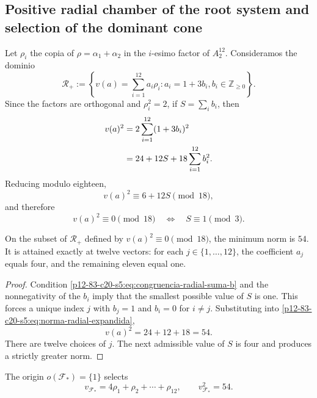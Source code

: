 \subsection{Positive radial chamber of the root system and selection of the dominant cone}

Let \(\rho_i\) the copia of \(\rho=\alpha_1+\alpha_2\) in the
\(i\)-esimo factor of \(A_2^{12}\). Consideramos the dominio
\begin{equation}
 \mathscr R_+
 :=\left\{
 v(a)=\sum_{i=1}^{12}a_i\rho_i:
 a_i=1+3b_i, b_i\in\mathbb Z_{\geq0}
 \right\}.
 \label{p12-83-c20-s5:eq:camara-radial-positiva}
\end{equation}
Since the factors are orthogonal and \(\rho_i^2=2\), if
\(S=\sum_i b_i\), then
\begin{align}
 v(a)^2
 &=2\sum_{i=1}^{12}(1+3b_i)^2\notag\\
 &=24+12S+18\sum_{i=1}^{12}b_i^2.
 \label{p12-83-c20-s5:eq:norma-radial-expandida}
\end{align}
Reducing modulo eighteen,
\[
 v(a)^2\equiv6+12S\pmod{18},
\]
and therefore
\begin{equation}
 v(a)^2\equiv0\pmod{18}
 \quad\Longleftrightarrow\quad
 S\equiv1\pmod3.
 \label{p12-83-c20-s5:eq:congruencia-radial-suma-b}
\end{equation}

\begin{proposition}
\label{p12-83-c20-s5:prop:minimos-camara-radial}
On the subset of \(\mathscr R_+\) defined by
\(v(a)^2\equiv0\pmod{18}\), the minimum norm is \(54\). It is attained
exactly at twelve vectors: for each \(j\in\{1,\ldots,12\}\), the
coefficient \(a_j\) equals four, and the remaining eleven equal one.
\end{proposition}

\begin{proof}
Condition \eqref{p12-83-c20-s5:eq:congruencia-radial-suma-b} and the nonnegativity of
the \(b_i\) imply that the smallest possible value of \(S\) is one. This
forces a unique index \(j\) with \(b_j=1\) and \(b_i=0\) for
\(i\neq j\). Substituting into \eqref{p12-83-c20-s5:eq:norma-radial-expandida},
\[
 v(a)^2=24+12+18=54.
\]
There are twelve choices of \(j\). The next admissible value of \(S\) is
four and produces a strictly greater norm.
\end{proof}

The origin \(o(\mathcal F_*)=\{1\}\) selects
\begin{equation}
 \boxed{
 v_{\mathcal F_*}
 =4\rho_1+\rho_2+\cdots+\rho_{12},
 \qquad
 v_{\mathcal F_*}^2=54.}
 \label{p12-83-c20-s5:eq:vector-marco-incidencial}
\end{equation}

